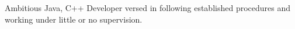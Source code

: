 

\begin{cvparagraph}

Ambitious Java, C++ Developer versed in following established procedures and working under little or no supervision.
\end{cvparagraph}
